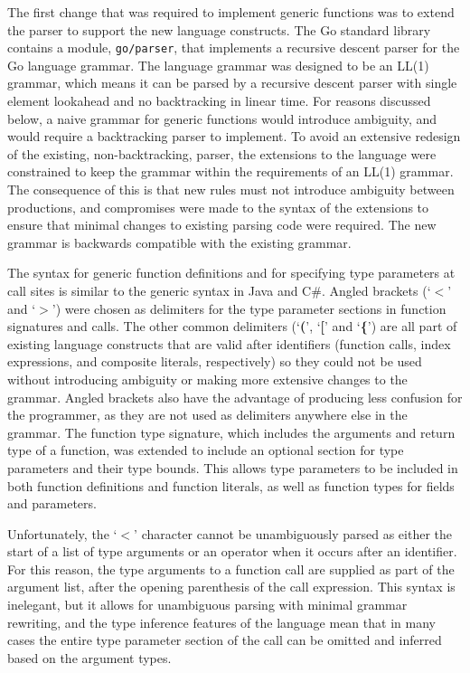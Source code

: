 \documentclass[letterpaper,twocolumn,11pt]{article}
\begin{document}
The first change that was required to implement generic functions was to extend the parser to support the new language constructs. The Go standard library contains a module, \texttt{go/parser}, that implements a recursive descent parser for the Go language grammar. The language grammar was designed to be an LL(1) grammar, which means it can be parsed by a recursive descent parser with single element lookahead and no backtracking in linear time. For reasons discussed below, a naive grammar for generic functions would introduce ambiguity, and would require a backtracking parser to implement. To avoid an extensive redesign of the existing, non-backtracking, parser, the extensions to the language were constrained to keep the grammar within the requirements of an LL(1) grammar. The consequence of this is that new rules must not introduce ambiguity between productions, and compromises were made to the syntax of the extensions to ensure that minimal changes to existing parsing code were required. The new grammar is backwards compatible with the existing grammar.

The syntax for generic function definitions and for specifying type parameters at call sites is similar to the generic syntax in Java and C\#. Angled brackets (`\textbf{$<$}' and `\textbf{$>$}') were chosen as delimiters for the type parameter sections in function signatures and calls. The other common delimiters (`\textbf{(}', `\textbf{[}' and `\textbf{\{}') are all part of existing language constructs that are valid after identifiers (function calls, index expressions, and composite literals, respectively) so they could not be used without introducing ambiguity or making more extensive changes to the grammar. Angled brackets also have the advantage of producing less confusion for the programmer, as they are not used as delimiters anywhere else in the grammar. The function type signature, which includes the arguments and return type of a function, was extended to include an optional section for type parameters and their type bounds. This allows type parameters to be included in both function definitions and function literals, as well as function types for fields and parameters.

Unfortunately, the `\textbf{$<$}' character cannot be unambiguously parsed as either the start of a list of type arguments or an operator when it occurs after an identifier. For this reason, the type arguments to a function call are supplied as part of the argument list, after the opening parenthesis of the call expression. This syntax is inelegant, but it allows for unambiguous parsing with minimal grammar rewriting, and the type inference features of the language mean that in many cases the entire type parameter section of the call can be omitted and inferred based on the argument types.
\end{document}

